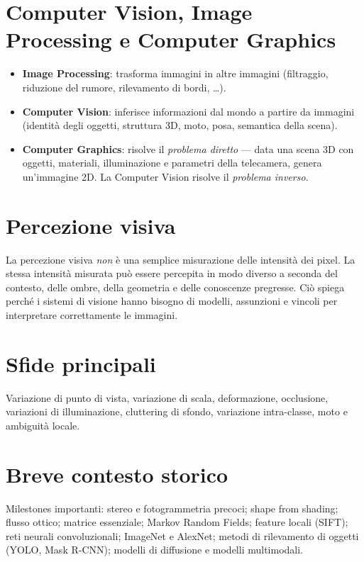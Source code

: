 \documentclass[12pt, a4paper]{report}
\begin{document}
\section{Computer Vision, Image Processing e Computer Graphics}

\begin{itemize}
  \item \textbf{Image Processing}: trasforma immagini in altre immagini (filtraggio,
        riduzione del rumore, rilevamento di bordi, \ldots).
  \item \textbf{Computer Vision}: inferisce informazioni dal mondo a partire da immagini
        (identità degli oggetti, struttura 3D, moto, posa, semantica della scena).
  \item \textbf{Computer Graphics}: risolve il \emph{problema diretto} --- data una scena
        3D con oggetti, materiali, illuminazione e parametri della telecamera, genera
        un'immagine 2D.  La Computer Vision risolve il \emph{problema inverso}.
\end{itemize}

\section{Percezione visiva}

La percezione visiva \emph{non} è una semplice misurazione delle intensità dei pixel.
La stessa intensità misurata può essere percepita in modo diverso a seconda del
contesto, delle ombre, della geometria e delle conoscenze pregresse.  Ciò spiega
perché i sistemi di visione hanno bisogno di modelli, assunzioni e vincoli per
interpretare correttamente le immagini.

\section{Sfide principali}

Variazione di punto di vista, variazione di scala, deformazione, occlusione,
variazioni di illuminazione, cluttering di sfondo, variazione intra-classe, moto e
ambiguità locale.

\section{Breve contesto storico}

Milestones importanti: stereo e fotogrammetria precoci; shape from shading;
flusso ottico; matrice essenziale; Markov Random Fields; feature locali (SIFT);
reti neurali convoluzionali; ImageNet e AlexNet; metodi di rilevamento di oggetti
(YOLO, Mask R-CNN); modelli di diffusione e modelli multimodali.
\end{document}
